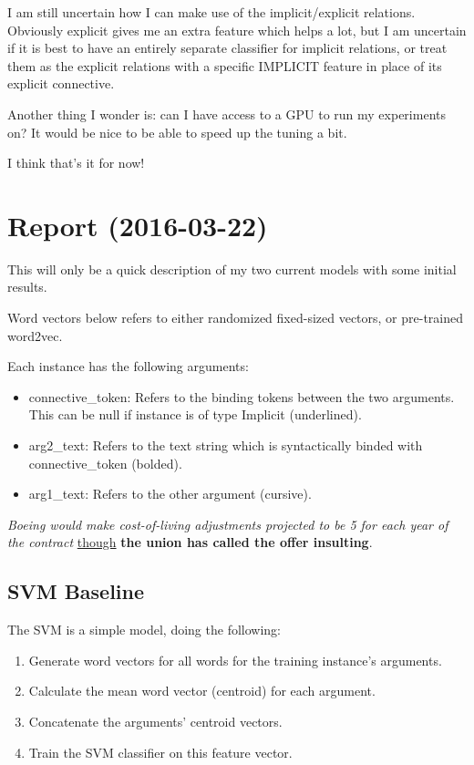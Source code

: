 I am still uncertain how I can make use of the implicit/explicit relations. Obviously explicit gives me an extra feature which helps a lot, but I am uncertain if it is best to have an entirely separate classifier for implicit relations, or treat them as the explicit relations with a specific IMPLICIT feature in place of its explicit connective.

Another thing I wonder is: can I have access to a GPU to run my experiments on? It would be nice to be able to speed up the tuning a bit.

I think that's it for now!

\section{Report (2016-03-22)}

This will only be a quick description of my two current models with some initial results.

Word vectors below refers to either randomized fixed-sized vectors, or pre-trained word2vec.

Each instance has the following arguments:

\begin{itemize}
	\item connective\_token: Refers to the binding tokens between the two arguments. This can be null if instance is of type Implicit (underlined).
	\item arg2\_text: Refers to the text string which is syntactically binded with connective\_token (bolded).
	\item arg1\_text: Refers to the other argument (cursive).
\end{itemize}


\begin{exe}
\ex \emph{Boeing would make cost-of-living adjustments projected to be 5 for each year of the contract} \underline{though} \textbf{the union has called the offer insulting}.\label{exemple:boeing}
\end{exe}


\subsection{SVM Baseline}

The SVM is a simple model, doing the following:
\begin{enumerate}
	\item Generate word vectors for all words for the training instance's arguments.
	\item Calculate the mean word vector (centroid) for each argument.
	\item Concatenate the arguments' centroid vectors.
	\item Train the SVM classifier on this feature vector.
\end{enumerate}


